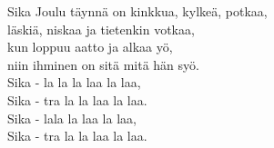 \begin{song}{Sika}
    \showversenumber
	Joulu täynnä on kinkkua, kylkeä, potkaa,\\
	läskiä, niskaa ja tietenkin votkaa,\\
	kun loppuu aatto ja alkaa yö,\\
	niin ihminen on sitä mitä hän syö.\\
	Sika - la la la laa la laa,\\
	Sika - tra la la laa la laa.\\
	Sika - lala la laa la laa,\\
	Sika - tra la la laa la laa.
	
\end{song}
